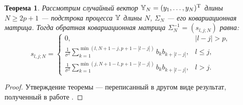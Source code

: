 \documentclass[12pt,a4paper]{article}
\newtheorem{theorem}{Теорема}
\begin{document}
\begin{theorem}\label{th:invcov}
	Рассмотрим случайный вектор $\mathbb{Y}_N = (y_1, \ldots, y_N)^{\mathrm{T}}$ длины $N \ge 2p + 1$ --- подстрока процесса $\mathbb{Y}$ длины $N$, $\Sigma_N$ --- его ковариационная матрица. Тогда обратная ковариационная матрица $\Sigma_N^{-1} = (s_{l, j; N})$ равна:
	\begin{equation*}
	s_{l, j; N} = \begin{cases}
	0, & |l - j| > p, \\
	\frac{1}{\sigma^2}\sum_{k = 1}^{\min(l, N + 1 - j, p + 1 - |l - j|)}b_k b_{k + |l - j|}, & l \le j, \\
	\frac{1}{\sigma^2}\sum_{k = 1}^{\min(j, N + 1 - l, p + 1 - |l - j|)}b_k b_{k + |l - j|}, & l > j.
	\end{cases}
	\end{equation*}
\end{theorem}
\begin{proof}
	Утверждение теоремы --- переписанный в другом виде результат, полученный в работе \cite{Verbyla1985}.
\end{proof}
\end{document}
